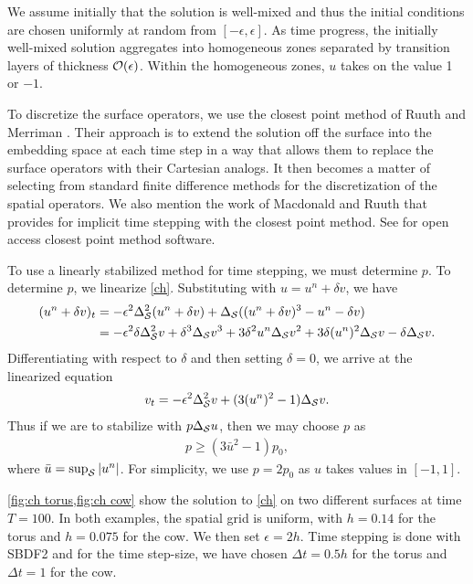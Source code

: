 We assume initially that the solution is well-mixed and thus the initial conditions are chosen uniformly at random from $[-\epsilon,\epsilon]$. As time progress, the initially well-mixed solution aggregates into homogeneous zones separated by transition layers of thickness $\O(\epsilon)$. Within the homogeneous zones, $u$ takes on the value 1 or $-1$. 

To discretize the surface operators, we use the closest point method of Ruuth and Merriman \cite{ruuth2008simple}. Their approach is to extend the solution off the surface into the embedding space at each time step in a way that allows them to replace the surface operators with their Cartesian analogs. It then becomes a matter of selecting from standard finite difference methods for the discretization of the spatial operators. We also mention the work of Macdonald and Ruuth \cite{macdonald2009implicit} that provides for implicit time stepping with the closest point method. See \cite{cpmcodes} for open access closest point method software.

To use a linearly stabilized method for time stepping, we must determine $p$. To determine $p$, we linearize \cref{ch}. Substituting with $u = u^n + \delta v$, we have 
\begin{align}
\begin{split} 
(u^n + \delta v)_t 
&= -\epsilon^2\Delta_\S^2 (u^n + \delta v) 
+ \Delta_\S((u^n + \delta v)^3 - u^n - \delta v) 
\\
&= -\epsilon^2\delta\Delta_\S^2 v
+ \delta^3\Delta_\S v^3 + 3\delta^2u^n \Delta_\S v^2 + 3\delta (u^n)^2 \Delta_\S v - \delta \Delta_\S v. 
\end{split} 
\label{ch linearize}
\end{align}
Differentiating with respect to $\delta$ and then setting $\delta = 0$, we arrive at the linearized equation 
\begin{align}
v_t = -\epsilon^2\Delta_\S^2 v + (3(u^n)^2-1) \Delta_\S v. 
\end{align}
Thus if we are to stabilize with $p\Delta_\S u$, then we may choose $p$ as 
\begin{align}
p \geq (3\bar u^2 - 1)p_0, 
\end{align}
where $\bar u = \sup_\S \abs{u^n}$. For simplicity, we use $p=2p_0$ as $u$ takes values in $[-1,1]$.  

\cref{fig:ch torus,fig:ch cow} show the solution to \cref{ch} on two different surfaces at time $T=100$. In both examples, the spatial grid is uniform, with $h=0.14$ for the torus and $h=0.075$ for the cow. We then set $\epsilon=2h$. Time stepping is done with SBDF2 and for the time step-size, we have chosen $\Delta t = 0.5h$ for the torus and $\Delta t = 1$ for the cow. 

